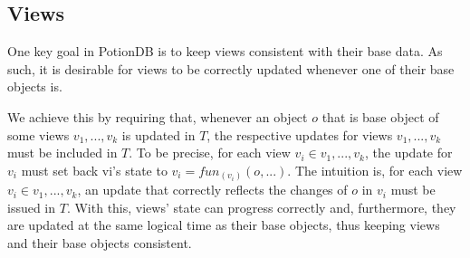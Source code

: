 \documentclass[sigplan,10pt]{acmart}
\begin{document}
%
%

\subsection{Views}
\label{subsec:viewsTransaction}

One key goal in PotionDB is to keep views consistent with their base data.
As such, it is desirable for views to be correctly updated whenever one of their base objects is.

We achieve this by requiring that, whenever an object $o$ that is base object of some views $v_1, ..., v_k$ is updated in $T$, the respective updates for views $v_1, ..., v_k$ must be included in $T$.
To be precise, for each view $v_i \in v_1, ..., v_k$, the update for $v_i$ must set back vi’s state to $v_i = fun_{(v_i)}(o, ...)$.
The intuition is, for each view $v_i \in v_1, ..., v_k$, an update that correctly reflects the changes of $o$ in $v_i$ must be issued in $T$.
With this, views' state can progress correctly and, furthermore, they are updated at the same logical time as their base objects, thus keeping views and their base objects consistent.
\end{document}
